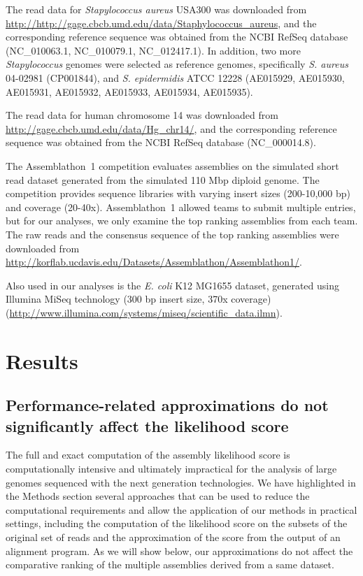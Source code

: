 The read data for \emph{Stapylococcus aureus} USA300 was downloaded from \url{
http://http://gage.cbcb.umd.edu/data/Staphylococcus_aureus}, and the
corresponding reference sequence was obtained from the NCBI RefSeq database (NC\_010063.1, NC\_010079.1, NC\_012417.1).
In addition, two more \emph{Stapylococcus} genomes were selected as
reference genomes, specifically \emph{S. aureus} 04-02981 (CP001844), and \emph{S. epidermidis} ATCC 12228 (AE015929, AE015930,
AE015931, AE015932, AE015933, AE015934, AE015935).

The read data for human chromosome 14 was downloaded from \url{http://gage.cbcb.umd.edu/data/Hg_chr14/}, and the corresponding reference sequence was obtained from the NCBI RefSeq database (NC\_000014.8).

The Assemblathon~1 competition evaluates assemblies on the simulated
short read dataset generated from the simulated 110 Mbp diploid genome.
The competition provides sequence libraries with varying insert sizes (200-10,000 bp)
and coverage (20-40x).
Assemblathon~1 allowed teams to submit multiple entries, but for our
analyses, we only examine the top ranking assemblies from each
team. The raw reads and the consensus sequence of the top ranking
assemblies were downloaded from \url{http://korflab.ucdavis.edu/Datasets/Assemblathon/Assemblathon1/}.

Also used in our analyses is the \emph{E. coli} K12 MG1655 dataset, generated using Illumina MiSeq technology
(300 bp insert size, 370x coverage) ({\url{http://www.illumina.com/systems/miseq/scientific_data.ilmn}}).

\section{Results}

\subsection{Performance-related approximations do not significantly
  affect the likelihood score}

The full and exact computation of the assembly likelihood score is
computationally intensive and ultimately impractical for the analysis
of large genomes sequenced with the next generation technologies. We have
highlighted in the Methods section several approaches that can be used
to reduce the computational requirements and allow the application of
our methods in practical settings, including the computation of the
likelihood score on the subsets of the original set of reads and the
approximation of the score from the output of an alignment program.
As we will show below,
our approximations do not affect the comparative ranking of the multiple assemblies derived from a same dataset.


